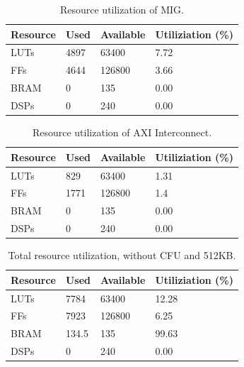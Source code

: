 \begin{table}[H]
\centering
\caption{Resource utilization of MIG.}
\begin{tabular}{|l|l|l|l|}
\hline
Resource & Used & Available & Utiliziation (\%) \\ \hline
LUTs     & 4897 & 63400     & 7.72              \\ \hline
FFs      & 4644 & 126800    & 3.66              \\ \hline
BRAM     & 0    & 135       & 0.00              \\ \hline
DSPs     & 0    & 240       & 0.00              \\ \hline
\end{tabular}
\label{tab:}
\end{table}

\begin{table}[H]
\centering
\caption{Resource utilization of AXI Interconnect.}
\begin{tabular}{|l|l|l|l|}
\hline
Resource & Used & Available & Utiliziation (\%) \\ \hline
LUTs     & 829 & 63400     & 1.31              \\ \hline
FFs      & 1771 & 126800    & 1.4              \\ \hline
BRAM     & 0    & 135       & 0.00              \\ \hline
DSPs     & 0    & 240       & 0.00              \\ \hline
\end{tabular}
\label{tab:}
\end{table}

\begin{table}[H]
\centering
\caption{Total resource utilization, without CFU and 512KB.}
\begin{tabular}{|l|l|l|l|}
\hline
Resource & Used & Available & Utiliziation (\%) \\ \hline
LUTs     & 7784 & 63400     & 12.28              \\ \hline
FFs      & 7923 & 126800    & 6.25              \\ \hline
BRAM     & 134.5    & 135       & 99.63              \\ \hline
DSPs     & 0    & 240       & 0.00              \\ \hline
\end{tabular}
\label{tab:}
\end{table}

